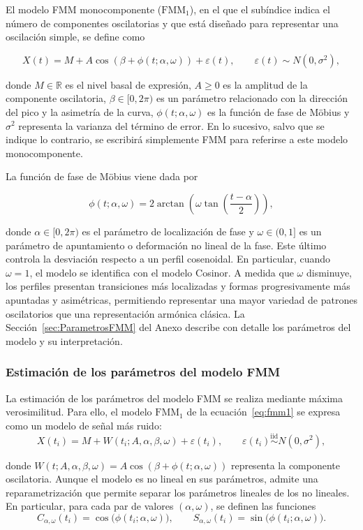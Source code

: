 \documentclass[12pt, a4paper]{report}
\begin{document}
El modelo FMM monocomponente (\(\mathrm{FMM}_1\)), en el que el subíndice indica el número de componentes oscilatorias y que está diseñado para representar una oscilación simple, se define como

\begin{equation}
X(t)=M+A\cos\!\left(\beta+\phi(t;\alpha,\omega)\right)+\varepsilon(t),
\qquad
\varepsilon(t)\sim N(0,\sigma^2),
\label{eq:fmm1}
\end{equation}

donde \(M\in\mathbb{R}\) es el nivel basal de expresión, \(A\geq0\) es la amplitud de la componente oscilatoria, \(\beta\in[0,2\pi)\) es un parámetro relacionado con la dirección del pico y la asimetría de la curva, \(\phi(t;\alpha,\omega)\) es la función de fase de Möbius y \(\sigma^2\) representa la varianza del término de error. En lo sucesivo, salvo que se indique lo contrario, se escribirá simplemente FMM para referirse a este modelo monocomponente.

La función de fase de Möbius viene dada por

\[
\phi(t;\alpha,\omega)=
2\arctan\!\left(
\omega\tan\left(\frac{t-\alpha}{2}\right)
\right),
\]

donde \(\alpha\in[0,2\pi)\) es el parámetro de localización de fase y \(\omega\in(0,1]\) es un parámetro de apuntamiento o deformación no lineal de la fase. Este último controla la desviación respecto a un perfil cosenoidal. En particular, cuando \(\omega=1\), el modelo se identifica con el modelo Cosinor. A medida que \(\omega\) disminuye, los perfiles presentan transiciones más localizadas y formas progresivamente más apuntadas y asimétricas, permitiendo representar una mayor variedad de patrones oscilatorios que una representación armónica clásica. La Sección~\ref{sec:ParametrosFMM} del Anexo describe con detalle los parámetros del modelo y su interpretación.

\subsubsection{Estimación de los parámetros del modelo FMM}

La estimación de los parámetros del modelo FMM se realiza mediante máxima verosimilitud. Para ello, el modelo \(\mathrm{FMM}_1\) de la ecuación~\eqref{eq:fmm1} se expresa como un modelo de señal más ruido:
\[
X(t_i)=M+W(t_i;A,\alpha,\beta,\omega)+\varepsilon(t_i),
\qquad
\varepsilon(t_i)\overset{\mathrm{iid}}{\sim}N(0,\sigma^2),
\]

donde \(W(t;A,\alpha,\beta,\omega)=A\cos(\beta+\phi(t;\alpha,\omega))\) representa la componente oscilatoria.
Aunque el modelo es no lineal en sus parámetros, admite una reparametrización que permite separar los parámetros lineales de los no lineales. En particular, para cada par de valores \((\alpha,\omega)\), se definen las funciones
\[
C_{\alpha,\omega}(t_i)=\cos\bigl(\phi(t_i;\alpha,\omega)\bigr),
\qquad
S_{\alpha,\omega}(t_i)=\sin\bigl(\phi(t_i;\alpha,\omega)\bigr).
\]
\end{document}
